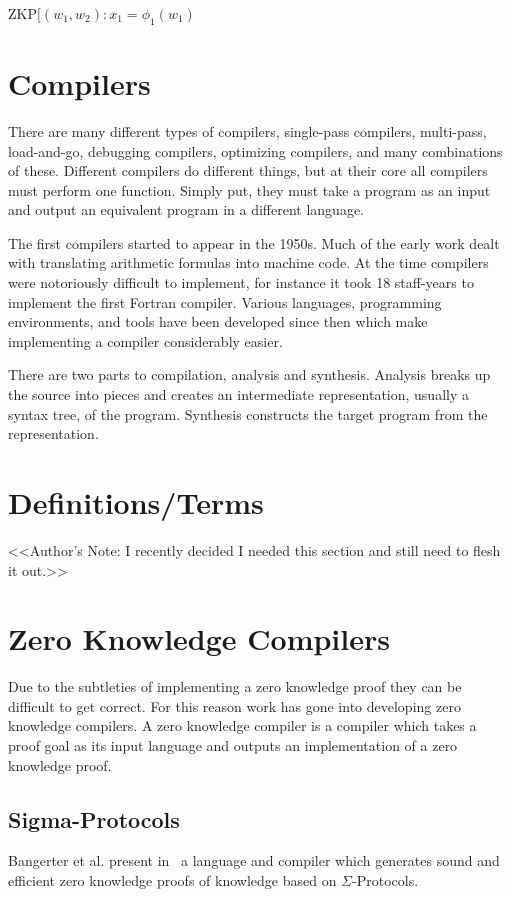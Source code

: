 \documentclass{sig-alternate}
\begin{document}
	\begin{center}
		$\text{ZKP}[(w_{1},w_{2}):x_{1} = \phi_{1}(w_{1})$
	\end{center}

\section{Compilers}
	There are many different types of compilers, single-pass compilers, multi-pass,
	load-and-go, debugging compilers, optimizing compilers, and many combinations
	of these. Different compilers do different things, but at their core all 
	compilers must perform one function. Simply put, they must take a program as 
	an input and output	an equivalent program in a different
	language.~\cite{Compiler:1986} 
	
	The first compilers started to appear in the 1950s. Much of the early work
	dealt with translating arithmetic formulas into machine code. At the time
	compilers were notoriously difficult to implement, for instance it took
	18 staff-years to implement the first Fortran compiler. Various languages,
	programming	environments, and tools have been developed since then which
	make implementing a compiler considerably easier.
	
	There are two parts to compilation, analysis and synthesis. Analysis breaks
	up the source into pieces and creates an intermediate representation, usually
	a syntax tree, of the program. Synthesis constructs the target program from
    the representation.
    
\section{Definitions/Terms}
	<<Author's Note: I recently decided I needed this section and still need
	to flesh it out.>>    
    

\section{Zero Knowledge Compilers}
	Due to the subtleties of implementing a zero knowledge proof they
	can be difficult to get correct. For this reason work has gone into
	developing zero knowledge compilers. A zero knowledge compiler is a
	compiler which takes a proof goal as its input language
	and outputs an implementation of a zero knowledge proof.

	\subsection{Sigma-Protocols}
		Bangerter et al. present in~\cite{Sigma:2009} a language and compiler
		which generates sound and efficient zero knowledge proofs of knowledge
		based on $\Sigma$-Protocols.	
	
\end{document}
